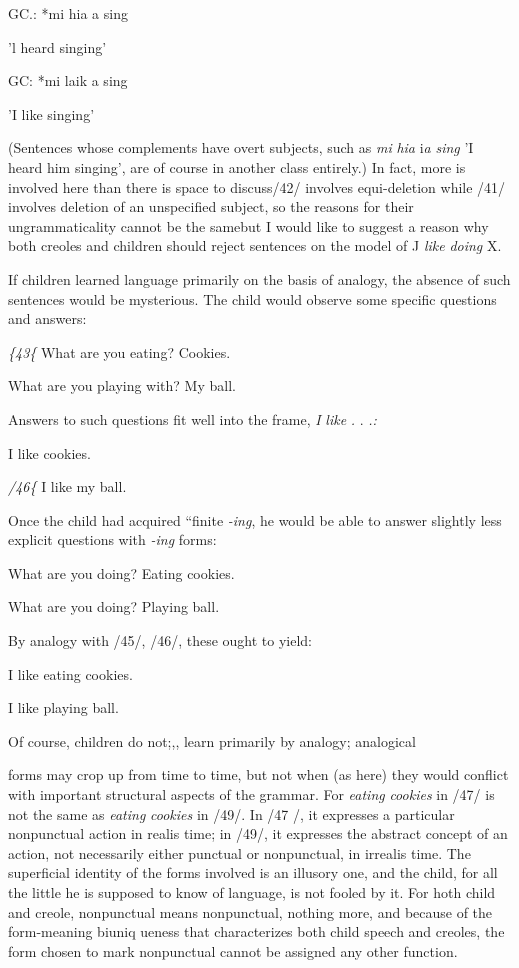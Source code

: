\ea\label{ex:41}
 GC.: *mi hia a sing
\glt
\z

'l heard singing'


\ea\label{ex:42}
 GC: *mi laik a sing
\glt
\z

'I like singing'

(Sentences whose complements have overt subjects, such as \textit{mi} \textit{hia} i\textit{a} \textit{si}\textit{n}\textit{g} 'I heard him singing', are of course in another class entirely.) In fact, more is involved here than there is space to discuss/42/ involves equi-deletion while /41/ involves deletion of an unspecified subject, so the reasons for their ungrammaticality cannot be the samebut I would like to suggest a reason why both creoles and children should reject sentences on the model of J \textit{like} \textit{doing} X.

If children learned language primarily on the basis of analogy, the absence of such sentences would be mysterious. The child would observe some specific questions and answers:

\textit{\{43\{ }What are you eating? Cookies.

\ea\label{ex:44}
 What are you playing with? My ball.
\glt
\z

Answers to such questions fit well into the frame, \textit{I} \textit{like} \textit{.} . \textit{.}\textit{:}

\ea\label{ex:45}
 I like cookies.
\glt
\z

\textit{/46\{ }I like my ball.

Once the child had acquired ``finite \textit{{}-ing},\textit{{\textquotedbl}} he would be able to answer slightly less explicit questions with \textit{{}-ing} forms:

\ea\label{ex:47}
 What are you doing? Eating cookies.
\glt
\z

\ea\label{ex:48}
 What are you doing? Playing ball.
\glt
\z

By analogy with /45/, /46/, these ought to yield:

\ea\label{ex:49}
 I like eating cookies.
\glt
\z

\ea\label{ex:50}
 I like playing ball.
\glt
\z

Of course, children do not;,, learn primarily by analogy; analogical


forms may crop up from time to time, but not when (as here) they would conflict with important structural aspects of the grammar. For \textit{eating} \textit{cookies} in /47/ is not the same as \textit{eating} \textit{cookies} in /49/. In /47 /, it expresses a particular nonpunctual action in realis time; in /49/, it expresses the abstract concept of an action, not necessarily either punctual or nonpunctual, in irrealis time. The superficial identity of the forms involved is an illusory one, and the child, for all the little he is supposed to know of language, is not fooled by it. For hoth child and creole, nonpunctual means nonpunctual, nothing more, and be\-cause of the form-meaning biuniq ueness that characterizes both child speech and creoles, the form chosen to mark nonpunctual cannot be assigned any other function.

